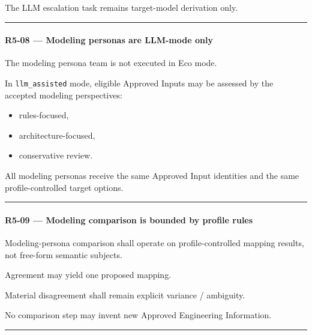 The LLM escalation task remains target-model derivation only.

\begin{center}\rule{0.5\linewidth}{0.5pt}\end{center}

\hypertarget{r5-08--modeling-personas-are-llm-mode-only}{%
\paragraph{R5-08 --- Modeling personas are LLM-mode only}\label{r5-08--modeling-personas-are-llm-mode-only}}

The modeling persona team is not executed in Eco mode.

In \texttt{llm\_assisted} mode, eligible Approved Inputs may be assessed by the accepted modeling perspectives:

\begin{itemize}
\tightlist
\item
  rules-focused,
\item
  architecture-focused,
\item
  conservative review.
\end{itemize}

All modeling personas receive the same Approved Input identities and the same profile-controlled target options.

\begin{center}\rule{0.5\linewidth}{0.5pt}\end{center}

\hypertarget{r5-09--modeling-comparison-is-bounded-by-profile-rules}{%
\paragraph{R5-09 --- Modeling comparison is bounded by profile rules}\label{r5-09--modeling-comparison-is-bounded-by-profile-rules}}

Modeling-persona comparison shall operate on profile-controlled mapping results, not free-form semantic subjects.

Agreement may yield one proposed mapping.

Material disagreement shall remain explicit variance / ambiguity.

No comparison step may invent new Approved Engineering Information.

\begin{center}\rule{0.5\linewidth}{0.5pt}\end{center}


